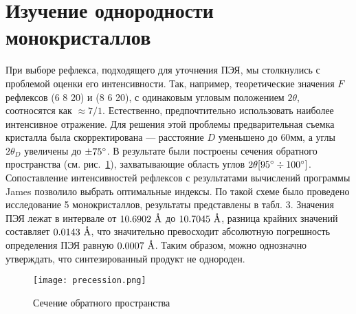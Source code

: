 \section{Изучение однородности монокристаллов \YEu{}}

При выборе рефлекса, подходящего для уточнения ПЭЯ, мы столкнулись с проблемой оценки его интенсивности.
Так, например, теоретические значения $F$ рефлексов \hkl(6 8 20) и \hkl(8 6 20), с одинаковым угловым положением $2\theta$, соотносятся как $\approx 7/1$.
Естественно, предпочтительно использовать наиболее интенсивное отражение.
Для решения этой проблемы предварительная съемка кристалла была скорректирована --- расстояние $D$ уменьшено до $60\unit{мм}$, а углы $2\theta_D$ увеличены до $\pm 75^\circ$.
В результате были построены сечения обратного пространства (см. рис.~\ref{fig:precession}), захватывающие область углов $2\theta [95^\circ\div100^\circ]$.
Сопоставление интенсивностей рефлексов с результатами вычислений программы James позволило выбрать оптимальные индексы.
По такой схеме было проведено исследование 5 монокристаллов, результаты представлены в табл. 3. Значения ПЭЯ лежат в интервале от $10.6902\ \text{\AA}$ до $10.7045\ \text{\AA}$, разница крайних значений составляет $0.0143\ \text{\AA}$, что значительно превосходит абсолютную погрешность определения ПЭЯ равную $0.0007\ \text{\AA}$.
Таким образом, можно однозначно утверждать, что синтезированный продукт не однороден.

\begin{figure}[ht!]
    \centering
    \texttt{[image: precession.png]}
    \caption{Сечение обратного пространства}%
    \label{fig:precession}
\end{figure}

